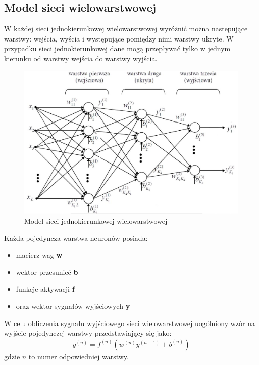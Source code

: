 \documentclass[12pt,twoside]{article}
\begin{document}
\subsection{Model sieci wielowarstwowej}
W każdej sieci jednokierunkowej wielowarstwowej wyróżnić można nastepujące warstwy: wejścia, wyścia i występujące pomiędzy nimi warstwy ukryte.
W przypadku sieci jednokierunkowej dane mogą przepływać tylko w jednym kierunku od warstwy wejścia do warstwy wyjścia.
\begin{figure}[ht!]
	\centering
	\includegraphics[width=12cm]{figures/model_sieci.png}
	\caption{Model sieci jednokierunkowej wielowarstwowej}
	\label{Fig:model_sieci}
\end{figure}

Każda pojedyncza warstwa neuronów posiada:
\begin{itemize}
	\item macierz wag \textbf{w}
\end{itemize}
\begin{itemize}[resume]
	\item wektor przesunieć \textbf{b}
\end{itemize}
\begin{itemize}[resume]
	\item funkcje aktywacji \textbf{f}
	\item oraz wektor sygnałów wyjściowych \textbf{y}
\end{itemize}
W celu obliczenia sygnału wyjściowego sieci wielowarstwowej uogólniony wzór na wyjście pojedynczej warstwy przedstawiający się jako:
\begin{equation}
	y^{(n)}=f^{(n)}(w^{(n)}y^{(n-1)}+b^{(n)})
\end{equation}
gdzie $n$ to numer odpowiedniej warstwy.
\end{document}
